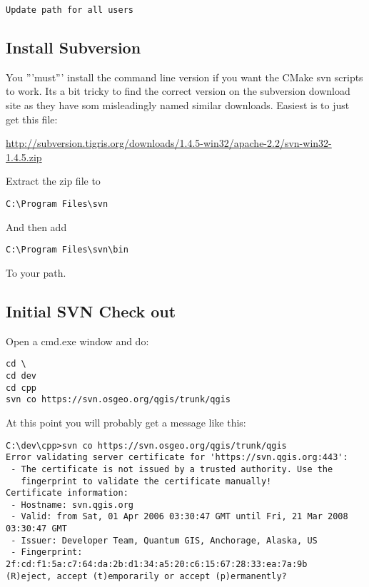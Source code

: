 \begin{verbatim}
Update path for all users
\end{verbatim}

\subsection{Install Subversion}
You '''must''' install the command line version if you want the CMake svn scripts to work.
Its a bit tricky to find the correct version on the subversion download site as they have 
som misleadingly named similar downloads. Easiest is to just get this file:

\url{http://subversion.tigris.org/downloads/1.4.5-win32/apache-2.2/svn-win32-1.4.5.zip}

Extract the zip file to

\begin{verbatim}
C:\Program Files\svn
\end{verbatim}

And then add

\begin{verbatim}
C:\Program Files\svn\bin
\end{verbatim}

To your path.

\subsection{Initial SVN Check out}
Open a cmd.exe window and do:

\begin{verbatim}
cd \
cd dev
cd cpp
svn co https://svn.osgeo.org/qgis/trunk/qgis 
\end{verbatim}

At this point you will probably get a message like this:

\begin{verbatim}
C:\dev\cpp>svn co https://svn.osgeo.org/qgis/trunk/qgis
Error validating server certificate for 'https://svn.qgis.org:443':
 - The certificate is not issued by a trusted authority. Use the
   fingerprint to validate the certificate manually!
Certificate information:
 - Hostname: svn.qgis.org
 - Valid: from Sat, 01 Apr 2006 03:30:47 GMT until Fri, 21 Mar 2008 03:30:47 GMT
 - Issuer: Developer Team, Quantum GIS, Anchorage, Alaska, US
 - Fingerprint: 2f:cd:f1:5a:c7:64:da:2b:d1:34:a5:20:c6:15:67:28:33:ea:7a:9b
(R)eject, accept (t)emporarily or accept (p)ermanently?
\end{verbatim}

